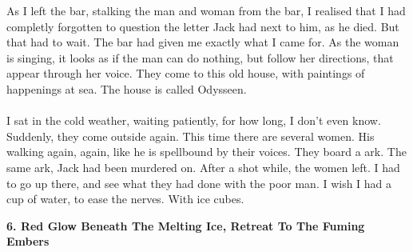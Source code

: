 \documentclass[]{article}
\begin{document}
As I left the bar, stalking the man and woman from the bar, I realised that I had completly forgotten to question the letter Jack had next to him, as he died. But that had to wait. The bar had given me exactly what I came for. As the woman is singing, it looks as if the man can do nothing, but follow her directions, that appear through her voice. They come to this old house, with paintings of happenings at sea. The house is called Odysseen.
\\ \\
I sat in the cold weather, waiting patiently, for how long, I don't even know. Suddenly, they come outside again. This time there are several women. His walking again, again, like he is spellbound by their voices. They board a ark. The same ark, Jack had been murdered on. After a shot while, the women left. I had to go up there, and see what they had done with the poor man. I wish I had a cup of water, to ease the nerves. With ice cubes.

\newpage

\begin{center}
\large\textbf{6. Red Glow Beneath The Melting Ice, \newline Retreat To The Fuming Embers}
\end{center}
\end{document}
